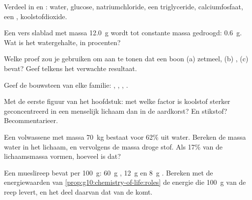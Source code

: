 \begin{exercise}[$\star$]\label{exo:g10:chemistry-of-life:2}
Verdeel in  en : water, glucose,
natriumchloride, een triglyceride, calciumfosfaat, een ,
koolstofdioxide.
\end{exercise}

\begin{exercise}[$\star$]\label{exo:g10:chemistry-of-life:3}
Een vers slablad met massa \qty{12.0}{g} wordt tot constante massa
gedroogd: \qty{0.6}{g}. Wat is het watergehalte, in procenten?
\end{exercise}

\begin{exercise}[$\star$]\label{exo:g10:chemistry-of-life:4}
Welke proef zou je gebruiken om aan te tonen dat een boon (a) zetmeel,
(b) , (c)  bevat? Geef telkens het verwachte resultaat.
\end{exercise}

\begin{exercise}[$\star$]\label{exo:g10:chemistry-of-life:5}
Geef de bouwsteen van elke familie: , , ,
.
\end{exercise}

\begin{exercise}[$\star\star$]\label{exo:g10:chemistry-of-life:6}
Met de eerste figuur van het hoofdstuk: met welke factor is koolstof
sterker geconcentreerd in een menselijk lichaam dan in de aardkorst? En
stikstof? Becommentarieer.
\end{exercise}

\begin{exercise}[$\star\star$]\label{exo:g10:chemistry-of-life:7}
Een volwassene met massa \qty{70}{kg} bestaat voor 62\% uit water.
Bereken de massa water in het lichaam, en vervolgens de massa droge
stof. Als  17\% van de lichaamsmassa vormen, hoeveel  is
dat?
\end{exercise}

\begin{exercise}[$\star\star$]\label{exo:g10:chemistry-of-life:8}
Een mueslireep bevat per \qty{100}{g}: \qty{60}{g} ,
\qty{12}{g}  en \qty{8}{g} . Bereken met de
energiewaarden van \cref{prop:g10:chemistry-of-life:roles} de energie
die \qty{100}{g} van de reep levert, en het deel daarvan dat van de
 komt.
\end{exercise}

